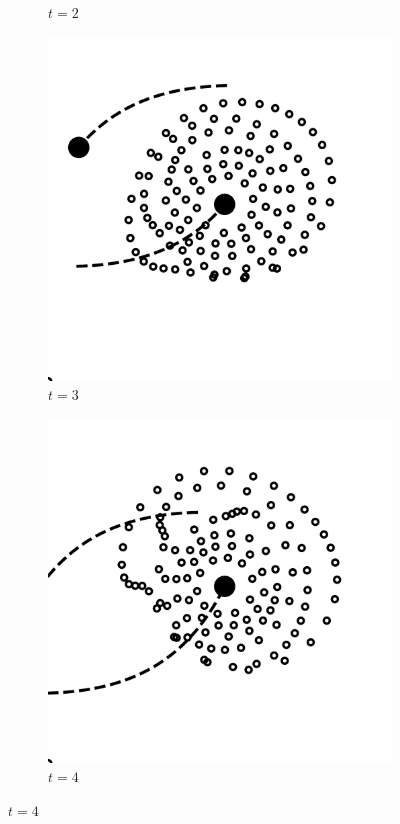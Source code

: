 \documentclass[11pt,twocolumn]{article}
\begin{document}
\begin{figure}[!htbp]
\begin{subfigure}[b]{0.2\textwidth}
    				\caption{$t = 2$}
  			\end{subfigure}
            \hfill
            \begin{subfigure}[b]{0.2\textwidth}
    			\includegraphics[width=\textwidth]{fig_1/Fig3_3_000000_0.pdf}
    				\caption{$t = 3$}
  			\end{subfigure}
            \hfill
            \begin{subfigure}[b]{0.2\textwidth}
    			\includegraphics[width=\textwidth]{fig_1/Fig3_4_000000_0.pdf}
    				\caption{$t = 4$}
  			\end{subfigure}
  			

\end{figure}
\end{document}
